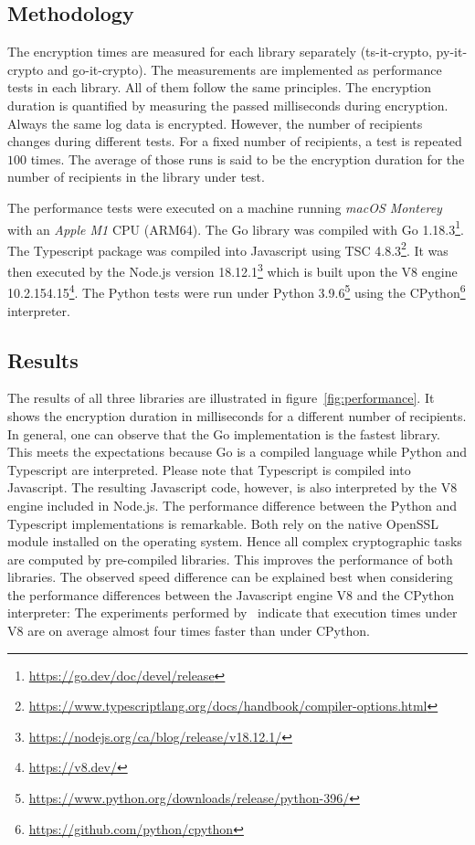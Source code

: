 \documentclass[../main.tex]{subfiles}
\begin{document}
\subsection{Methodology}
The encryption times are measured for each library separately (ts-it-crypto, py-it-crypto and go-it-crypto).
The measurements are implemented as performance tests in each library.
All of them follow the same principles.
The encryption duration is quantified by measuring the passed milliseconds during encryption.
Always the same log data is encrypted.
However, the number of recipients changes during different tests.
For a fixed number of recipients, a test is repeated $100$ times.
The average of those runs is said to be the encryption duration for the number of recipients in the library under test.

The performance tests were executed on a machine running \emph{macOS Monterey} with an \emph{Apple M1} CPU (ARM64).
The Go library was compiled with Go 1.18.3\footnote{\url{https://go.dev/doc/devel/release}}.
The Typescript package was compiled into Javascript using TSC 4.8.3\footnote{\url{https://www.typescriptlang.org/docs/handbook/compiler-options.html}}. 
It was then executed by the Node.js version 18.12.1\footnote{\url{https://nodejs.org/ca/blog/release/v18.12.1/}} which is built upon the V8 engine 10.2.154.15\footnote{\url{https://v8.dev/}}.
The Python tests were run under Python 3.9.6\footnote{\url{https://www.python.org/downloads/release/python-396/}} using the CPython\footnote{\url{https://github.com/python/cpython}} interpreter.

\subsection{Results}
The results of all three libraries are illustrated in figure~\ref{fig:performance}.
It shows the encryption duration in milliseconds for a different number of recipients.
In general, one can observe that the Go implementation is the fastest library.
This meets the expectations because Go is a compiled language while Python and Typescript are interpreted.
Please note that Typescript is compiled into Javascript.
The resulting Javascript code, however, is also interpreted by the V8 engine included in Node.js.
The performance difference between the Python and Typescript implementations is remarkable.
Both rely on the native OpenSSL module installed on the operating system.
Hence all complex cryptographic tasks are computed by pre-compiled libraries.
This improves the performance of both libraries.
The observed speed difference can be explained best when considering the performance differences between the Javascript engine V8 and the CPython interpreter:
The experiments performed by~\cite{Lion2022} indicate that execution times under V8 are on average almost four times faster than under CPython.
\end{document}
